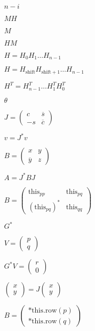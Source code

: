 \documentclass{article}
\begin{document}
$ n-i $
\pagebreak

$ MH $
\pagebreak

$ M $
\pagebreak

$ HM $
\pagebreak

$ H = H_0 H_1 \ldots H_{n-1} $
\pagebreak

$ H = H_{\mathrm{shift}} H_{\mathrm{shift}+1} \ldots H_{n-1} $
\pagebreak

$ H^T = H_{n-1}^T \ldots H_1^T H_0^T $
\pagebreak

$ \theta $
\pagebreak

$ J = \left ( \begin{array}{cc} c & \overline s \\ -s & \overline c \end{array} \right ) $
\pagebreak

$ v = J^* v $
\pagebreak

$ B = \left ( \begin{array}{cc} x & y \\ \overline y & z \end{array} \right )$
\pagebreak

$ A = J^* B J $
\pagebreak

$ B = \left ( \begin{array}{cc} \text{this}_{pp} & \text{this}_{pq} \\ (\text{this}_{pq})^* & \text{this}_{qq} \end{array} \right )$
\pagebreak

$ G^* $
\pagebreak

$ V = \left ( \begin{array}{c} p \\ q \end{array} \right )$
\pagebreak

$ G^* V = \left ( \begin{array}{c} r \\ 0 \end{array} \right )$
\pagebreak

$ \left ( \begin{array}{cc} x \\ y \end{array} \right ) = J \left ( \begin{array}{cc} x \\ y \end{array} \right ) $
\pagebreak

$ B = \left ( \begin{array}{cc} \text{*this.row}(p) \\ \text{*this.row}(q) \end{array} \right ) $
\pagebreak
\end{document}
